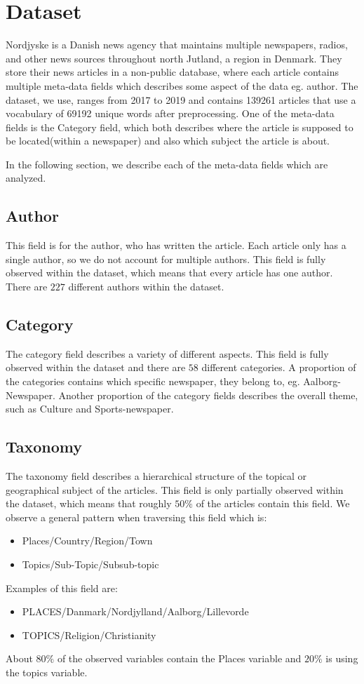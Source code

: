 \section{Dataset}
Nordjyske is a Danish news agency that maintains multiple newspapers, radios, and other news sources throughout north Jutland, a region in Denmark.
They store their news articles in a non-public database, where each article contains multiple meta-data fields which describes some aspect of the data eg. author.
The dataset, we use, ranges from 2017 to 2019 and contains 139261 articles that use a vocabulary of 69192 unique words after preprocessing.
One of the meta-data fields is the Category field, which both describes where the article is supposed to be located(within a newspaper) and also which subject the article is about.

In the following section, we describe each of the meta-data fields which are analyzed.

\subsection{Author}
This field is for the author, who has written the article.
Each article only has a single author, so we do not account for multiple authors.
This field is fully observed within the dataset, which means that every article has one author.
There are $227$ different authors within the dataset.

\subsection{Category}
The category field describes a variety of different aspects. 
This field is fully observed within the dataset and there are $58$ different categories.
A proportion of the categories contains which specific newspaper, they belong to, eg. Aalborg-Newspaper.
Another proportion of the category fields describes the overall theme, such as Culture and Sports-newspaper.

\subsection{Taxonomy}
The taxonomy field describes a hierarchical structure of the topical or geographical subject of the articles.
This field is only partially observed within the dataset, which means that roughly $50\%$ of the articles contain this field.
We observe a general pattern when traversing this field which is:
\begin{itemize}
	\item Places/Country/Region/Town
	\item Topics/Sub-Topic/Subsub-topic
\end{itemize}
Examples of this field are:
\begin{itemize}
	\item PLACES/Danmark/Nordjylland/Aalborg/Lillevorde
	\item TOPICS/Religion/Christianity
\end{itemize}
About $80\%$ of the observed variables contain the Places variable and $20\%$ is using the topics variable. 

